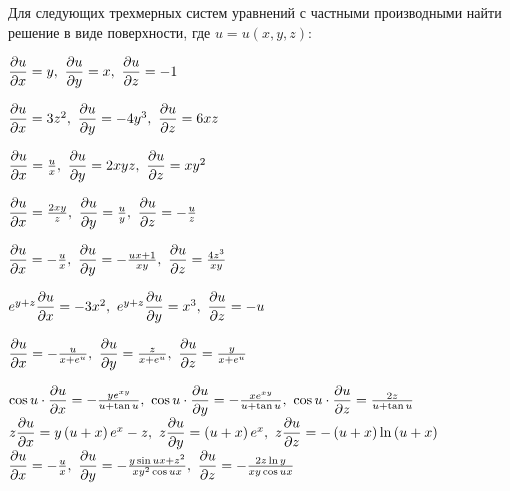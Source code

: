 	Для следующих трехмерных систем уравнений с частными производными найти решение в виде поверхности, где $u = u(x, y, z)$:

	\begin{multicols}{2}
		\begin{enumtasks}

			\label{nonlinsys_partialsyst:systems3}
			\item \( \dfrac{\partial u}{\partial x} = y, ~ \dfrac{\partial u}{\partial y} = x, ~ \dfrac{\partial u}{\partial z} = -1 \) %
			\item \( \dfrac{\partial u}{\partial x} = 3 z^2, ~ \dfrac{\partial u}{\partial y} = - 4 y^3, ~ \dfrac{\partial u}{\partial z} = 6xz \) %
			\item \( \dfrac{\partial u}{\partial x} = \frac{u}{x}, ~ \dfrac{\partial u}{\partial y} = 2xyz, ~ \dfrac{\partial u}{\partial z} = x y^2 \) %
			\item \( \dfrac{\partial u}{\partial x} = \frac{2 x y}{z}, ~ \dfrac{\partial u}{\partial y} = \frac{u}{y}, ~ \dfrac{\partial u}{\partial z} = - \frac{u}{z} \) %
			\item \( \dfrac{\partial u}{\partial x} = - \frac{u}{x}, ~ \dfrac{\partial u}{\partial y} = -\frac{ux + 1}{xy}, ~ \dfrac{\partial u}{\partial z} = \frac{4 z^3}{xy} \) %
			\item \( e^{y + z} \dfrac{\partial u}{\partial x} = - 3 x^2, ~ e^{y + z} \dfrac{\partial u}{\partial y} = x^3, ~ \dfrac{\partial u}{\partial z} = - u \) %

		\end{enumtasks}
	\end{multicols}

	\begin{enumtasks}
	
		\label{nonlinsys_partialsyst:systems3hard}
		\item \( \dfrac{\partial u}{\partial x} = - \frac{u}{x + e^u}, ~ \dfrac{\partial u}{\partial y} = \frac{z}{x + e^u}, ~ \dfrac{\partial u}{\partial z} = \frac{y}{x + e^u} \) %
		\item \( \cos{u} \cdot \dfrac{\partial u}{\partial x} = - \frac{y e^{xy}}{u + \tan{u}}, ~ \cos{u} \cdot \dfrac{\partial u}{\partial y} = - \frac{x e^{x y}}{u + \tan{u}}, ~ \cos{u} \cdot \dfrac{\partial u}{\partial z} = \frac{2 z}{u + \tan{u}} \) %
		\itemstar \( z \dfrac{\partial u}{\partial x} = y \left( u + x \right) e^x - z, ~ z\dfrac{\partial u}{\partial y} = \left( u + x \right) e^{x}, ~ z \dfrac{\partial u}{\partial z} = - \left( u + x \right) \ln\left( u + x \right) \) %
		\itemstar \( \dfrac{\partial u}{\partial x} = - \frac{u}{x}, ~ \dfrac{\partial u}{\partial y} = - \frac{y \sin{ux} + z^2}{x y^2 \cos{ux}}, ~ \dfrac{\partial u}{\partial z} = - \frac{2z \ln{y}}{xy \cos{ux}} \) %

	\end{enumtasks}

